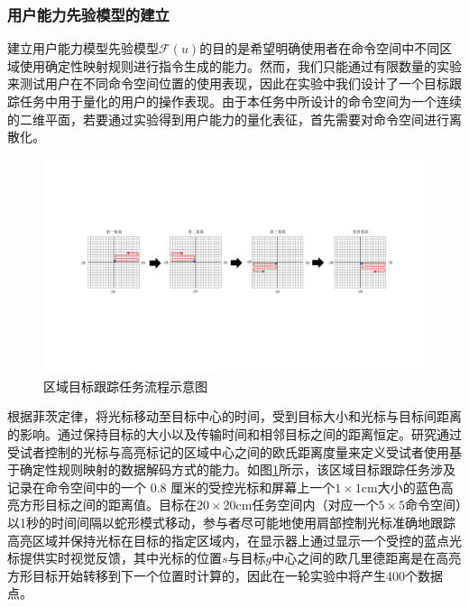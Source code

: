 \subsubsection{用户能力先验模型的建立}建立用户能力模型先验模型$\mathcal{F}(u)$的目的是希望明确使用者在命令空间中不同区域使用确定性映射规则进行指令生成的能力。然而，我们只能通过有限数量的实验来测试用户在不同命令空间位置的使用表现，因此在实验中我们设计了一个目标跟踪任务中用于量化的用户的操作表现。由于本任务中所设计的命令空间为一个连续的二维平面，若要通过实验得到用户能力的量化表征，首先需要对命令空间进行离散化。  
\begin{figure}[htb]
    \includegraphics[width=1\textwidth]{figures/3-Fig-8.pdf}
    \caption{区域目标跟踪任务流程示意图}
    \label{fig:3-8}
\end{figure}  

根据菲茨定律\cite{tangFittsLawModulated2018}，将光标移动至目标中心的时间，受到目标大小和光标与目标间距离的影响。通过保持目标的大小以及传输时间和相邻目标之间的距离恒定。研究通过受试者控制的光标与高亮标记的区域中心之间的欧氏距离度量来定义受试者使用基于确定性规则映射的数据解码方式的能力。如图\ref{fig:3-8}所示，该区域目标跟踪任务涉及记录在命令空间中的一个 0.8 厘米的受控光标和屏幕上一个$1\times1$cm大小的蓝色高亮方形目标之间的距离值。目标在$20\times20$cm任务空间内（对应一个$5\times5$命令空间）以1秒的时间间隔以蛇形模式移动，参与者尽可能地使用肩部控制光标准确地跟踪高亮区域并保持光标在目标的指定区域内，在显示器上通过显示一个受控的蓝点光标提供实时视觉反馈，其中光标的位置$s$与目标$g$中心之间的欧几里德距离是在高亮方形目标开始转移到下一个位置时计算的，因此在一轮实验中将产生400个数据点。

